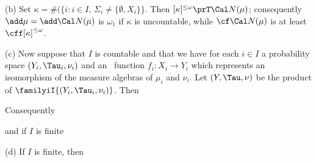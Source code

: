 
(b) Set $\kappa=\#(\{i:i\in I$, $\Sigma_i\ne\{\emptyset,X_i\}\}$.
Then $[\kappa]^{\le\omega}\prT\Cal N(\mu)$;  consequently
$\add\mu=\add\Cal N(\mu)$ is $\omega_1$ if $\kappa$ is uncountable,
while $\cf\Cal N(\mu)$ is at least $\cff[\kappa]^{\le\omega}$.

(c) Now suppose that $I$ is countable and that
we have for each $i\in I$ a probability space
$(Y_i,\Tau_i,\nu_i)$ and an \imp\ function
$f_i:X_i\to Y_i$ which represents an isomorphism of the measure algebras of
$\mu_i$ and $\nu_i$.   Let $(Y,\Tau,\nu)$ be the product of
$\familyiI{(Y_i,\Tau_i,\nu_i)}$.   Then


\noindent Consequently


\noindent and if $I$ is finite


(d) If $I$ is finite, then


